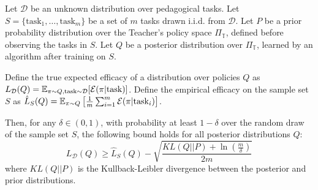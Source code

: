 \begin{theorem}
\label{thm:pac_bayes_generalization}
Let $\mathcal{D}$ be an unknown distribution over pedagogical tasks. Let $S = \{\text{task}_1, \dots, \text{task}_m\}$ be a set of $m$ tasks drawn i.i.d. from $\mathcal{D}$. Let $P$ be a prior probability distribution over the Teacher's policy space $\Pi_{\mathbb{T}}$, defined before observing the tasks in $S$. Let $Q$ be a posterior distribution over $\Pi_{\mathbb{T}}$, learned by an algorithm after training on $S$.

Define the true expected efficacy of a distribution over policies $Q$ as $L_{\mathcal{D}}(Q) = \mathbb{E}_{\pi \sim Q, \text{task} \sim \mathcal{D}}[\mathcal{E}(\pi | \text{task})]$.
Define the empirical efficacy on the sample set $S$ as $\hat{L}_S(Q) = \mathbb{E}_{\pi \sim Q} \left[ \frac{1}{m} \sum_{i=1}^m \mathcal{E}(\pi | \text{task}_i) \right]$.

Then, for any $\delta \in (0, 1)$, with probability at least $1-\delta$ over the random draw of the sample set $S$, the following bound holds for all posterior distributions $Q$:
\[
L_{\mathcal{D}}(Q) \ge \hat{L}_S(Q) - \sqrt{\frac{KL(Q || P) + \ln(\frac{m}{\delta})}{2m}}
\]
where $KL(Q || P)$ is the Kullback-Leibler divergence between the posterior and prior distributions.
\end{theorem}
